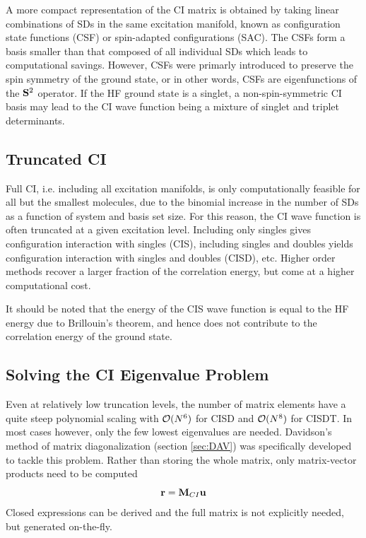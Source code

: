 A more compact representation of the CI matrix is obtained by taking linear combinations of SDs in the same excitation manifold, known as configuration state functions (CSF) or spin-adapted configurations (SAC). The CSFs form a basis smaller than that composed of all individual SDs which leads to computational savings. However, CSFs were primarly introduced to preserve the spin symmetry of the ground state, or in other words, CSFs are eigenfunctions of the $\mathbf{S}^2$ operator. If the HF ground state is a singlet, a non-spin-symmetric CI basis may lead to the CI wave function being a mixture of singlet and triplet determinants. 

\subsection{Truncated CI}

Full CI, i.e. including all excitation manifolds, is only computationally feasible for all but the smallest molecules, due to the binomial increase in the number of SDs as a function of system and basis set size. For this reason, the CI wave function is often truncated at a given excitation level. Including only singles gives configuration interaction with singles (CIS), including singles and doubles yields configuration interaction with singles and doubles (CISD), etc. Higher order methods recover a larger fraction of the correlation energy, but come at a higher computational cost.

It should be noted that the energy of the CIS wave function is equal to the HF energy due to Brillouin's theorem, and hence does not contribute to the correlation energy of the ground state.  

\subsection{Solving the CI Eigenvalue Problem}

Even at relatively low truncation levels, the number of matrix elements have a quite steep polynomial scaling with $\mathcal{O}(N^{6})$ for CISD and $\mathcal{O}(N^{8})$ for CISDT. In most cases however, only the few lowest eigenvalues are needed. Davidson's method of matrix diagonalization (section \ref{sec:DAV}) was specifically developed to tackle this problem. Rather than storing the whole matrix, only matrix-vector products need to be computed
\begin{equation}
\mathbf{r} = \mathbf{M}_{CI} \mathbf{u}
\end{equation}
\noindent Closed expressions can be derived and the full matrix is not explicitly needed, but generated on-the-fly. 

